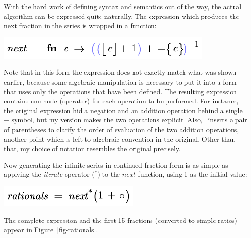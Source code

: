 %  
%    

With the hard work of defining syntax and semantics out of the way, the actual algorithm can be expressed quite naturally. The expression which produces the next fraction in the series is wrapped in a function:
\begin{center}
\includegraphics[scale=0.8]{src/image/rationals-next.pdf}
\end{center}
Note that in this form the expression does not exactly match what was shown earlier, because some algebraic manipulation is necessary to put it into a form that uses only the operations that have been defined. The resulting expression contains one node (operator) for each operation to be performed. For instance, the original expression hid a negation and an addition operation behind a single $-$ symbol, but my version makes the two operations explicit. Also, \Meta\ inserts a pair of parentheses to clarify the order of evaluation of the two addition operations, another point which is left to algebraic convention in the original. Other than that, my choice of notation resembles the original precisely.

Now generating the infinite series in continued fraction form is as simple as applying the \emph{iterate} operator (${}^*$) to the $\mathit{next}$ function, using 1 as the initial value:
\begin{center}
\includegraphics[scale=0.8]{src/image/rationals-iter.pdf}
\end{center}
The complete expression and the first 15 fractions (converted to simple ratios) appear in Figure~\ref{fig-rationals}. 

